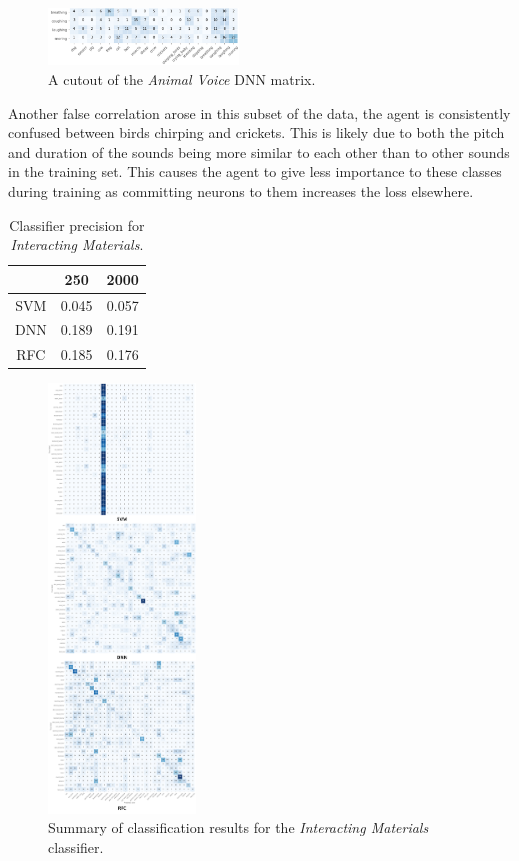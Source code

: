 \begin{figure}[h]
    \centering
    \includegraphics[width=0.45\textwidth]{figures/breathcorrelation.png}
    \caption{A cutout of the \textit{Animal Voice} DNN matrix.}
    \label{fig:breath}
\end{figure}

Another false correlation arose in this subset of the data, the agent is consistently confused between birds chirping and crickets. This is likely due to both the pitch and duration of the sounds being more similar to each other than to other sounds in the training set. This causes the agent to give less importance to these classes during training as committing neurons to them increases the loss elsewhere.

\begin{table}[h]
    \begin{tabular}{ccc}
        & 250   & 2000  \\ \hline
    SVM & 0.045 & 0.057 \\
    DNN & 0.189 & 0.191 \\
    RFC & 0.185 & 0.176
    \end{tabular}
    \caption{Classifier precision for \textit{Interacting Materials}.}
    \label{tab:interactprec}
\end{table}

\begin{figure}[h]
    \includegraphics[width=0.35\textwidth]{figures/Material_Classification_Comparison.png}
    \caption{Summary of classification results for the \textit{Interacting Materials} classifier.}
    \label{fig:InterClass}
\end{figure}

